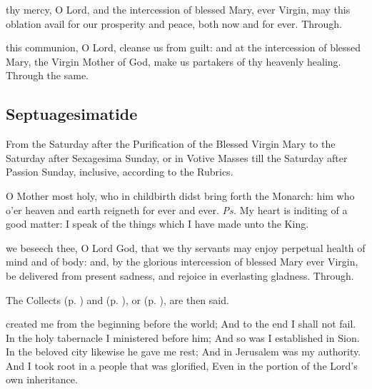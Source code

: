 \vspace{-0.25\baselineskip}

\secret
{} thy mercy, O Lord, and the intercession of blessed Mary, ever Virgin, may this oblation avail for our prosperity and peace, both now and for ever. Through.

\vspace{-0.25\baselineskip}

\postcommunion
{} this communion, O Lord, cleanse us from guilt: and at the intercession of blessed Mary, the Virgin Mother of God, make us partakers of thy heavenly healing. Through the same.


\clearpage
\subsection{Septuagesimatide}
\begin{rubric}
    {From the Saturday after the Purification of the Blessed Virgin Mary to the Saturday after Sexagesima Sunday, or in Votive Masses till the Saturday after Passion Sunday, inclusive, according to the Rubrics.}
\end{rubric}
\introit
{} O Mother most holy, who in childbirth didst bring forth the Monarch: him who o'er heaven and earth reigneth for ever and ever. \textit{Ps.} My heart is inditing of a good matter: I speak of the things which I have made unto the King.

\collect
{} we beseech thee, O Lord God, that we thy servants may enjoy perpetual health of mind and of body: and, by the glorious intercession of blessed Mary ever Virgin, be delivered from present sadness, and rejoice in everlasting gladness. Through.
\begin{rubric}
    The Collects  (p. \pageref{SPHolyGhost}) and  (p. \pageref{SPAgainst}), or  (p. \pageref{SPChiefBishop}), are then said.
\end{rubric}

 created me from the beginning before the world; And to the end I shall not fail. In the holy tabernacle I ministered before him; And so was I established in Sion. In the beloved city likewise he gave me rest; And in Jerusalem was my authority. And I took root in a people that was glorified, Even in the portion of the Lord’s own inheritance.

